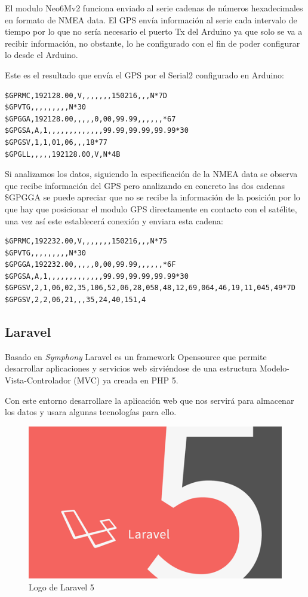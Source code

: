 El modulo Neo6Mv2 funciona enviado al serie cadenas de números hexadecimales en formato de NMEA data. El GPS envía información al serie cada intervalo de tiempo por lo que no sería necesario el puerto Tx del Arduino ya que solo se va a recibir información, no obstante, lo he configurado con el fin de poder configurar lo desde el Arduino.

Este es el resultado que envía el GPS por el Serial2 configurado en Arduino:

\begin{lstlisting}
$GPRMC,192128.00,V,,,,,,,150216,,,N*7D
$GPVTG,,,,,,,,,N*30
$GPGGA,192128.00,,,,,0,00,99.99,,,,,,*67
$GPGSA,A,1,,,,,,,,,,,,,99.99,99.99,99.99*30
$GPGSV,1,1,01,06,,,18*77
$GPGLL,,,,,192128.00,V,N*4B
\end{lstlisting}
Si analizamos los datos, siguiendo la especificación de la NMEA data se observa que recibe información del GPS pero analizando en concreto las dos cadenas \$GPGGA se puede apreciar que no se recibe la información de la posición por lo que hay que posicionar el modulo GPS directamente en contacto con el satélite, una vez así este establecerá conexión y enviara esta cadena:\\


\begin{lstlisting}
$GPRMC,192232.00,V,,,,,,,150216,,,N*75
$GPVTG,,,,,,,,,N*30
$GPGGA,192232.00,,,,,0,00,99.99,,,,,,*6F
$GPGSA,A,1,,,,,,,,,,,,,99.99,99.99,99.99*30
$GPGSV,2,1,06,02,35,106,52,06,28,058,48,12,69,064,46,19,11,045,49*7D
$GPGSV,2,2,06,21,,,35,24,40,151,4
\end{lstlisting}

\subsection{Laravel}

Basado en \textit{Symphony} Laravel es un framework Opensource que permite desarrollar aplicaciones y servicios web sirviéndose de una estructura Modelo-Vista-Controlador (MVC) ya creada en PHP 5.

Con este entorno desarrollare la aplicación web que nos servirá para almacenar  los datos y usara algunas tecnologías para ello.

\begin{figure}[!h]
\centering
\includegraphics[width=0.4\linewidth]{figuras/laralogo}
\caption{Logo de Laravel 5}
\label{fig:laralogo}
\end{figure}


